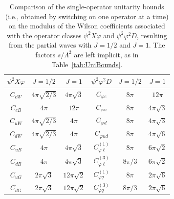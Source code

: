 \begin{table}[htbp]
\renewcommand{\arraystretch}{1.4}
\centering
\begin{tabular}{c|cc||c|cc}
\toprule
\rowcolor{hdrcolor}
\boldmath$\psi^2X\varphi$ & \boldmath$J=1/2$ & \boldmath$J=1$
& \boldmath$\psi^2\varphi^2D$ & \boldmath$J=1/2$ & \boldmath$J=1$ \\
\midrule
$C_{eW}$ & $4\pi\sqrt{2/3}$ & $4\pi\sqrt{3}$ 
& $C_{\varphi e}$ & $8\pi$ & $12\pi$ \\
$C_{eB}$ & $4\pi$ & $12\pi$ 
& $C_{\varphi u}$ & $8\pi$ & $4\pi\sqrt{3}$ \\
$C_{uW}$ & $4\pi\sqrt{2/3}$ & $4\pi$ 
& $C_{\varphi d}$ & $8\pi$ & $4\pi\sqrt{3}$ \\
$C_{dW}$ & $4\pi\sqrt{2/3}$ & $4\pi$ 
& $C_{\varphi ud}$ & $8\pi$ & $4\pi\sqrt{6}$ \\
$C_{uB}$ & $4\pi$ & $4\pi\sqrt{3}$ 
& $C_{\varphi \ell}^{(1)}$ & $8\pi$ & $6\pi\sqrt{2}$ \\
$C_{dB}$ & $4\pi$ & $4\pi\sqrt{3}$ 
& $C_{\varphi \ell}^{(3)}$ & $8\pi/3$ & $6\pi\sqrt{2}$ \\
$C_{uG}$ & $2\pi\sqrt{3}$ & $12\pi\sqrt{2}$ 
& $C_{\varphi q}^{(1)}$ & $8\pi$ & $2\pi\sqrt{6}$ \\
$C_{dG}$ & $2\pi\sqrt{3}$ & $12\pi\sqrt{2}$ 
& $C_{\varphi q}^{(3)}$ & $8\pi/3$ & $2\pi\sqrt{6}$ \\
\bottomrule
\end{tabular}
\caption{Comparison of the single-operator unitarity bounds (i.e., obtained by switching on one operator at a time) on the modulus of the Wilson coefficients
associated with the operator classes $\psi^2 X \varphi$ and $\psi^2 \varphi^2 D$, resulting from the
partial waves with $J=1/2$ and $J=1$. The factors $s/\Lambda^2$ are left implicit, as in
Table~\ref{tab:UniBounds}.}
\label{tab: UB for psi^2 Xphi and psi^2phi^2D}
\end{table}
